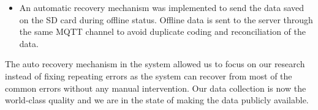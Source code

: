 \begin{itemize}
 \item An automatic recovery mechanism was implemented to send the data saved on the SD card during offline status. Offline data is sent to the server through the same MQTT channel to avoid duplicate coding and reconciliation of the data.
\end{itemize}

The auto recovery mechanism in the system allowed us to focus on our research instead of fixing repeating errors as the system can recover from most of the common errors without any manual intervention. Our data collection is now the world-class quality and we are in the state of making the data publicly available.
